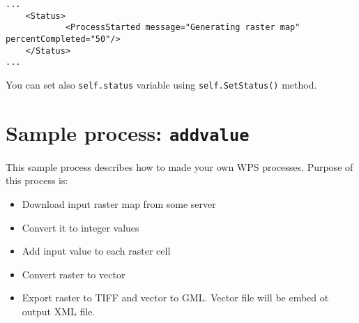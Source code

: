 \documentclass[a4paper,11pt]{article}
\begin{document}
\begin{verbatim}
...
    <Status>
            <ProcessStarted message="Generating raster map" percentCompleted="50"/>
    </Status>
...
\end{verbatim}

You can set also \texttt{self.status} variable using
\texttt{self.SetStatus()} method.

\appendix

    \section{Sample process: \texttt{addvalue}}
    This sample process describes how to made your own WPS processes. Purpose of this process is:
    \begin{itemize}
    \item  Download input raster map from some server
    \item  Convert it to integer values
    \item  Add input value to each raster cell
    \item  Convert raster to vector
    \item  Export raster to TIFF and vector to GML. Vector file will be embed ot output XML file.
    \end{itemize}
\end{document}
